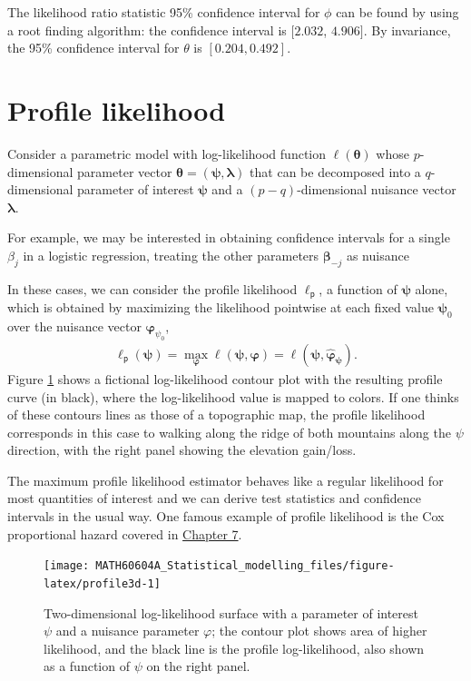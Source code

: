 \documentclass[
  11pt,
  letterpaper,
]{book}
\theoremstyle{definition}
\theoremstyle{definition}
\theoremstyle{definition}
\theoremstyle{remark}
\begin{document}
The likelihood ratio statistic 95\% confidence interval for \(\phi\) can be found by using a root finding algorithm: the confidence interval is \([2.032\), \(4.906]\). By invariance, the 95\% confidence interval for \(\theta\) is \([0.204, 0.492]\).

\hypertarget{profile-likelihood}{%
\section{Profile likelihood}\label{profile-likelihood}}

Consider a parametric model with log-likelihood function \(\ell(\boldsymbol{\theta})\) whose \(p\)-dimensional parameter vector \(\boldsymbol{\theta}=(\boldsymbol{\psi}, \boldsymbol{\lambda})\) that can be decomposed into a \(q\)-dimensional parameter of interest \(\boldsymbol{\psi}\) and a \((p-q)\)-dimensional nuisance vector \(\boldsymbol{\lambda}\).

For example, we may be interested in obtaining confidence intervals for a single \(\beta_j\) in a logistic regression, treating the other parameters \(\boldsymbol{\beta}_{-j}\) as nuisance

In these cases, we can consider the profile likelihood \(\ell_{\mathsf{p}}\), a function of \(\boldsymbol{\psi}\) alone, which is obtained by maximizing the likelihood pointwise at each fixed value \(\boldsymbol{\psi}_0\) over the nuisance vector \(\boldsymbol{\varphi}_{\psi_0}\),
\begin{align*}
\ell_{\mathsf{p}}(\boldsymbol{\psi})=\max_{\boldsymbol{\varphi}}\ell(\boldsymbol{\psi}, \boldsymbol{\varphi})=\ell(\boldsymbol{\psi}, \widehat{\boldsymbol{\varphi}}_{\boldsymbol{\psi}}).
\end{align*}
Figure \ref{fig:profile3d} shows a fictional log-likelihood contour plot with the resulting profile curve (in black), where the log-likelihood value is mapped to colors. If one thinks of these contours lines as those of a topographic map, the profile likelihood corresponds in this case to walking along the ridge of both mountains along the \(\psi\) direction, with the right panel showing the elevation gain/loss.

The maximum profile likelihood estimator behaves like a regular likelihood for most quantities of interest and we can derive test statistics and confidence intervals in the usual way. One famous example of profile likelihood is the Cox proportional hazard covered in \protect\hyperlink{survival}{Chapter 7}.

\begin{figure}

{\centering \texttt{[image: MATH60604A\_Statistical\_modelling\_files/figure-latex/profile3d-1]} 

}

\caption{Two-dimensional log-likelihood surface with a parameter of interest $\psi$ and a nuisance parameter $\varphi$; the contour plot shows area of higher likelihood, and the black line is the profile log-likelihood, also shown as a function of $\psi$ on the right panel.}\label{fig:profile3d}
\end{figure}
\end{document}

